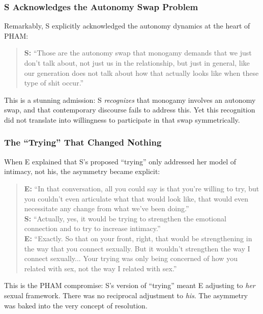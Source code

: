 \documentclass[12pt, letterpaper]{article}
\begin{document}
\subsubsection{S Acknowledges the Autonomy Swap Problem}

Remarkably, S explicitly acknowledged the autonomy dynamics at the heart of PHAM:

\begin{quote}
\textbf{S:} ``Those are the autonomy swap that monogamy demands that we just don't talk about, not just us in the relationship, but just in general, like our generation does not talk about how that actually looks like when these type of shit occur.''
\end{quote}

This is a stunning admission: S \textit{recognizes} that monogamy involves an autonomy swap, and that contemporary discourse fails to address this. Yet this recognition did not translate into willingness to participate in that swap symmetrically.

\subsubsection{The ``Trying'' That Changed Nothing}

When E explained that S's proposed ``trying'' only addressed her model of intimacy, not his, the asymmetry became explicit:

\begin{quote}
\textbf{E:} ``In that conversation, all you could say is that you're willing to try, but you couldn't even articulate what that would look like, that would even necessitate any change from what we've been doing.''\\[0.5em]
\textbf{S:} ``Actually, yes, it would be trying to strengthen the emotional connection and to try to increase intimacy.''\\[0.5em]
\textbf{E:} ``Exactly. So that on your front, right, that would be strengthening in the way that you connect sexually. But it wouldn't strengthen the way I connect sexually... Your trying was only being concerned of how you related with sex, not the way I related with sex.''
\end{quote}

This is the PHAM compromise: S's version of ``trying'' meant E adjusting to \textit{her} sexual framework. There was no reciprocal adjustment to \textit{his}. The asymmetry was baked into the very concept of resolution.
\end{document}
